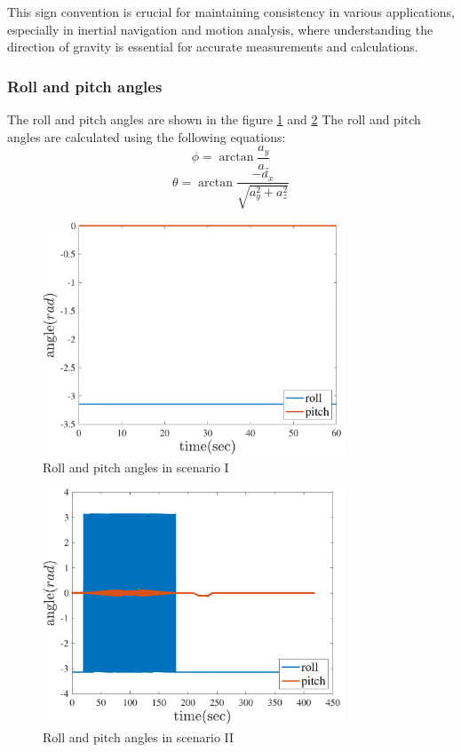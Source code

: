 This sign convention is crucial for maintaining consistency in various applications, especially in inertial navigation and motion analysis, where understanding the direction of gravity is essential for accurate measurements and calculations.

\subsubsection{Roll and pitch angles}

  The roll and pitch angles are shown in the figure \ref{fig:roll_pitch_angles} and \ref{fig:roll_pitch_angles_2}
The roll and pitch angles are calculated using the following equations:
\begin{equation}
  \phi = \arctan{\frac{a_y}{a_z}}
\end{equation}
\begin{equation}
  \theta = \arctan{\frac{-a_x}{\sqrt{a_y^2 + a_z^2}}}
\end{equation}

\begin{figure}[H]
  \centering
  \includegraphics[width=0.8\textwidth]{../Figure/Q1/roll_pitch}
  \caption{Roll and pitch angles in scenario I}
  \label{fig:roll_pitch_angles}
\end{figure}

\begin{figure}[H]
  \centering
  \includegraphics[width=0.8\textwidth]{../Figure/Q1/roll_pitch_2}
  \caption{Roll and pitch angles in scenario II}
  \label{fig:roll_pitch_angles_2}
\end{figure}
